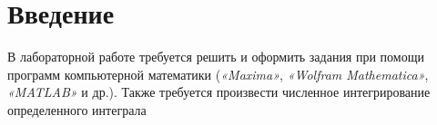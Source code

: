 \section{Введение}
В лабораторной работе требуется решить и оформить задания при помощи программ компьютерной математики (\textit{«Maxima»}, \textit{«Wolfram Mathematica»}, \textit{«MATLAB»} и др.). Также требуется произвести численное интегрирование  определенного интеграла
